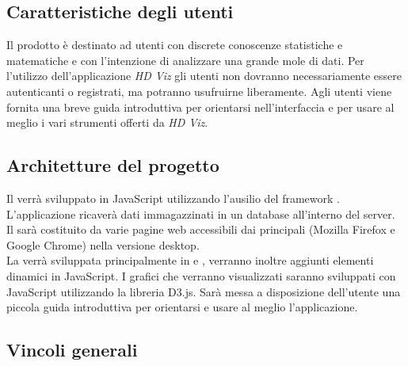 \documentclass[../analisi-dei-requisiti.tex]{subfiles}
\begin{document}
\subsection{Caratteristiche degli utenti}
\label{subs:caratteristiche_degli_utenti}
Il prodotto è destinato ad utenti con discrete conoscenze statistiche e matematiche e con l'intenzione di analizzare una grande mole di dati.
Per l'utilizzo dell'applicazione \emph{HD Viz} gli utenti non dovranno necessariamente essere autenticanti o registrati, ma potranno usufruirne liberamente.
Agli utenti viene fornita una breve guida introduttiva per orientarsi nell'interfaccia e per usare al meglio i vari strumenti offerti da \emph{HD Viz}.


\subsection{Architetture del progetto}
\label{subs:architetture_e_tecnologie_del_progetto}
Il  verrà sviluppato in JavaScript utilizzando l'ausilio del framework . L'applicazione ricaverà dati immagazzinati in un database  all'interno del server. \\
Il  sarà costituito da varie pagine web accessibili dai principali  (Mozilla Firefox e Google Chrome) nella versione desktop. \\
La  verrà sviluppata principalmente in  e , verranno inoltre aggiunti elementi dinamici in JavaScript. I grafici che verranno visualizzati saranno sviluppati con JavaScript utilizzando la libreria D3.js.
Sarà messa a disposizione dell'utente una piccola guida introduttiva per orientarsi e usare al meglio l'applicazione.


\subsection{Vincoli generali}
\label{subs:vincoli_generali}
\end{document}
